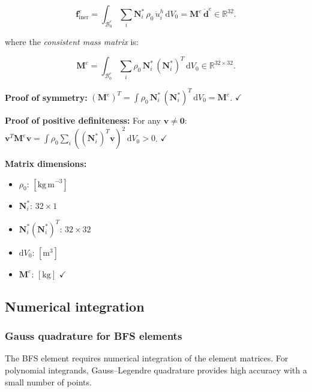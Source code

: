 \documentclass[11pt]{article}
\begin{document}
\begin{equation}
\boxed{
\mathbf{f}_{\mathrm{iner}}^{e}
= \int_{\mathcal{B}_{0}^{e}}
  \sum_{i}\mathbf{N}_{i}^{*}\,\rho_{0}\,\ddot{u}_{i}^{h}\,
  \mathrm{d}V_{0}
= \mathbf{M}^{e}\,\ddot{\mathbf{d}}^{e}
\in \mathbb{R}^{32}.
}
\label{s7:f_iner}
\end{equation}

where the \emph{consistent mass matrix} is:

\begin{equation}
\boxed{
\mathbf{M}^{e}
= \int_{\mathcal{B}_{0}^{e}}
  \sum_{i}\rho_{0}\,\mathbf{N}_{i}^{*}\,(\mathbf{N}_{i}^{*})^{T}\,
  \mathrm{d}V_{0}
\in \mathbb{R}^{32\times 32}.
}
\label{s7:mass_matrix}
\end{equation}

\textbf{Proof of symmetry:}
$(\mathbf{M}^{e})^{T} = \int \rho_{0}\,\mathbf{N}_{i}^{*}\,(\mathbf{N}_{i}^{*})^{T}\,\mathrm{d}V_{0}
= \mathbf{M}^{e}$. $\checkmark$

\textbf{Proof of positive definiteness:}
For any $\mathbf{v}\neq\mathbf{0}$:
$\mathbf{v}^{T}\mathbf{M}^{e}\mathbf{v}
= \int \rho_{0}\sum_{i}((\mathbf{N}_{i}^{*})^{T}\mathbf{v})^{2}\,\mathrm{d}V_{0} > 0$. $\checkmark$

\textbf{Matrix dimensions:}
\begin{itemize}
\item $\rho_{0}$: $[\mathrm{kg\,m}^{-3}]$
\item $\mathbf{N}_{i}^{*}$: $32\times 1$
\item $\mathbf{N}_{i}^{*}(\mathbf{N}_{i}^{*})^{T}$: $32\times 32$
\item $\mathrm{d}V_{0}$: $[\mathrm{m}^{3}]$
\item $\mathbf{M}^{e}$: $[\mathrm{kg}]$ $\checkmark$
\end{itemize}

\subsection{Numerical integration}
\label{ssec:integration}

\subsubsection{Gauss quadrature for BFS elements}

The BFS element requires numerical integration of the element matrices.
For polynomial integrands, Gauss--Legendre quadrature provides high
accuracy with a small number of points.
\end{document}
